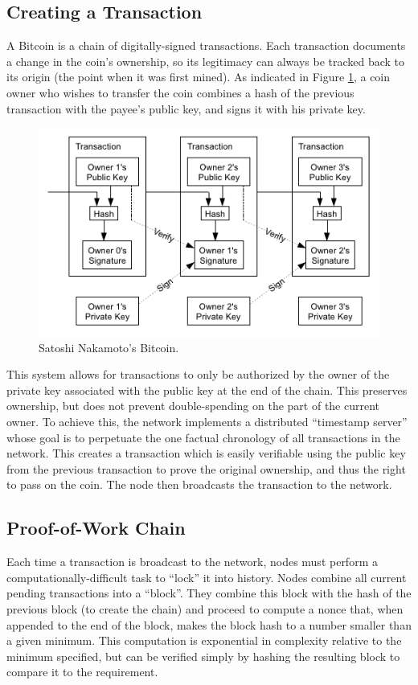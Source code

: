 \documentclass{report}
\begin{document}
  \subsection*{Creating a Transaction}
    A Bitcoin is a chain of digitally-signed transactions. Each transaction documents a change in the coin's ownership, so its legitimacy can always be tracked back to its origin (the point when it was first mined). As indicated in Figure \ref{fig:coinchain}, a coin owner who wishes to transfer the coin combines a hash of the previous transaction with the payee's public key, and signs it with his private key. 

    \begin{figure}[h]
      \begin{center}
        \includegraphics{images/coinchain.png}
        \caption{Satoshi Nakamoto's Bitcoin. \cite{Nakamoto:Bitcoin}}
        \label{fig:coinchain}
      \end{center}
    \end{figure}
    
    This system allows for transactions to only be authorized by the owner of the private key associated with the public key at the end of the chain. This preserves ownership, but does not prevent double-spending on the part of the current owner. To achieve this, the network implements a distributed ``timestamp server'' whose goal is to perpetuate the one factual chronology of all transactions in the network. This creates a transaction which is easily verifiable using the public key from the previous transaction to prove the original ownership, and thus the right to pass on the coin. The node then broadcasts the transaction to the network.

  \subsection*{Proof-of-Work Chain}
    Each time a transaction is broadcast to the network, nodes must perform a computationally-difficult task to ``lock'' it into history. Nodes combine all current pending transactions into a ``block''. They combine this block with the hash of the previous block (to create the chain) and proceed to compute a nonce that, when appended to the end of the block, makes the block hash to a number smaller than a given minimum. This computation is exponential in complexity relative to the minimum specified, but can be verified simply by hashing the resulting block to compare it to the requirement.
\end{document}

